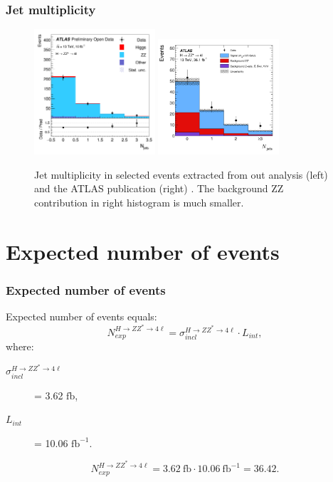 \documentclass[aspectratio=1610, english]{beamer}
\newcommand{\hzz}{ H\rightarrow ZZ^{*}\rightarrow 4 \ell}
\begin{document}
\begin{frame}
\frametitle{Jet multiplicity}

\begin{figure} [H]
\centering
\includegraphics[width=0.4\textwidth]{hist_n_jets.png}
\includegraphics[width=0.4\textwidth]{hist_n_jets_pub.png}
\caption{ Jet multiplicity in selected events extracted from out analysis (left) and the ATLAS publication (right) \cite{hzz}. The background ZZ contribution in right histogram is much smaller.}
\end{figure}

\end{frame}

\section{Expected number of events}

\begin{frame}
\frametitle{Expected number of events}
Expected number of events equals:
\begin{equation}
N^{ \hzz }_{exp}=\sigma^{ \hzz }_{incl} \cdot L_{int},
\end{equation}
where:
\begin{description}
\item[$\sigma^{ \hzz }_{incl}$] = 3.62 $\mathrm{fb}$,
\item[$L_{int}$] = 10.06 $\mathrm{fb}^{-1}$.
\end{description}
\vspace{1cm}
\begin{equation}
N^{\hzz}_{exp}=3.62 \: \mathrm{fb} \cdot 10.06 \: \mathrm{fb}^{-1} = 36.42.
\end{equation}

\end{frame}
\end{document}
